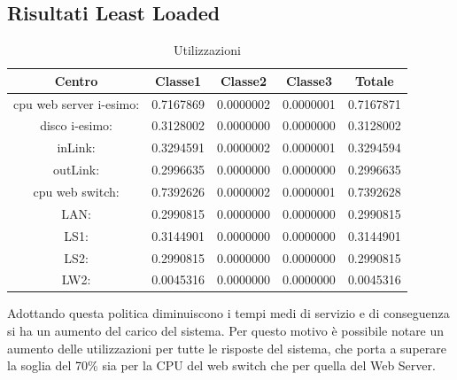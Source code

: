 \subsection{Risultati Least Loaded}
\begin{table}[htbp]
\begin{center}
\begin{tabular}{||c|c|c|c|c||}
\hline
Centro &Classe1 &Classe2 &Classe3 &Totale\\
\hline
\hline
 cpu web server i-esimo: 	&0.7167869	&0.0000002	&0.0000001	&0.7167871\\
\hline
 disco i-esimo: 	&0.3128002	&0.0000000	&0.0000000	&0.3128002\\
\hline
 inLink: 	&0.3294591	&0.0000002	&0.0000001	&0.3294594\\
\hline
 outLink: 	&0.2996635	&0.0000000	&0.0000000	&0.2996635\\
\hline
 cpu web switch: 	&0.7392626	&0.0000002	&0.0000001	&0.7392628\\
\hline
 LAN: 	&0.2990815	&0.0000000	&0.0000000	&0.2990815\\
\hline
 LS1: 	&0.3144901	&0.0000000	&0.0000000	&0.3144901\\
\hline
 LS2:	&0.2990815	&0.0000000	&0.0000000	&0.2990815\\
\hline
 LW2: 	&0.0045316	&0.0000000	&0.0000000	&0.0045316\\
\hline
\end{tabular}
\end{center}
\caption{Utilizzazioni}
\label{utilizzazioni}
\end{table}
Adottando questa politica diminuiscono i tempi medi di servizio e di conseguenza si ha un aumento del carico del sistema. Per questo motivo è possibile notare un aumento delle utilizzazioni per tutte le risposte del sistema, che porta a superare la soglia del 70\% sia per la CPU del web switch che per quella del Web Server.
